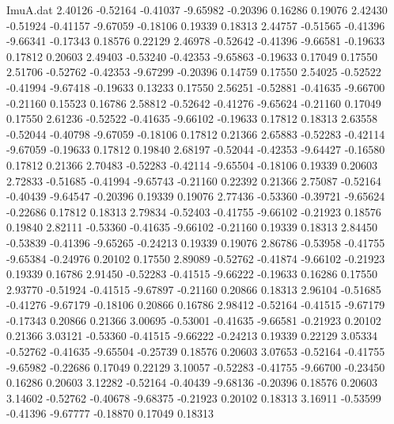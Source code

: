 \begin{filecontents}{ImuA.dat}
   2.40126   -0.52164   -0.41037   -9.65982   -0.20396    0.16286    0.19076
   2.42430   -0.51924   -0.41157   -9.67059   -0.18106    0.19339    0.18313
   2.44757   -0.51565   -0.41396   -9.66341   -0.17343    0.18576    0.22129
   2.46978   -0.52642   -0.41396   -9.66581   -0.19633    0.17812    0.20603
   2.49403   -0.53240   -0.42353   -9.65863   -0.19633    0.17049    0.17550
   2.51706   -0.52762   -0.42353   -9.67299   -0.20396    0.14759    0.17550
   2.54025   -0.52522   -0.41994   -9.67418   -0.19633    0.13233    0.17550
   2.56251   -0.52881   -0.41635   -9.66700   -0.21160    0.15523    0.16786
   2.58812   -0.52642   -0.41276   -9.65624   -0.21160    0.17049    0.17550
   2.61236   -0.52522   -0.41635   -9.66102   -0.19633    0.17812    0.18313
   2.63558   -0.52044   -0.40798   -9.67059   -0.18106    0.17812    0.21366
   2.65883   -0.52283   -0.42114   -9.67059   -0.19633    0.17812    0.19840
   2.68197   -0.52044   -0.42353   -9.64427   -0.16580    0.17812    0.21366
   2.70483   -0.52283   -0.42114   -9.65504   -0.18106    0.19339    0.20603
   2.72833   -0.51685   -0.41994   -9.65743   -0.21160    0.22392    0.21366
   2.75087   -0.52164   -0.40439   -9.64547   -0.20396    0.19339    0.19076
   2.77436   -0.53360   -0.39721   -9.65624   -0.22686    0.17812    0.18313
   2.79834   -0.52403   -0.41755   -9.66102   -0.21923    0.18576    0.19840
   2.82111   -0.53360   -0.41635   -9.66102   -0.21160    0.19339    0.18313
   2.84450   -0.53839   -0.41396   -9.65265   -0.24213    0.19339    0.19076
   2.86786   -0.53958   -0.41755   -9.65384   -0.24976    0.20102    0.17550
   2.89089   -0.52762   -0.41874   -9.66102   -0.21923    0.19339    0.16786
   2.91450   -0.52283   -0.41515   -9.66222   -0.19633    0.16286    0.17550
   2.93770   -0.51924   -0.41515   -9.67897   -0.21160    0.20866    0.18313
   2.96104   -0.51685   -0.41276   -9.67179   -0.18106    0.20866    0.16786
   2.98412   -0.52164   -0.41515   -9.67179   -0.17343    0.20866    0.21366
   3.00695   -0.53001   -0.41635   -9.66581   -0.21923    0.20102    0.21366
   3.03121   -0.53360   -0.41515   -9.66222   -0.24213    0.19339    0.22129
   3.05334   -0.52762   -0.41635   -9.65504   -0.25739    0.18576    0.20603
   3.07653   -0.52164   -0.41755   -9.65982   -0.22686    0.17049    0.22129
   3.10057   -0.52283   -0.41755   -9.66700   -0.23450    0.16286    0.20603
   3.12282   -0.52164   -0.40439   -9.68136   -0.20396    0.18576    0.20603
   3.14602   -0.52762   -0.40678   -9.68375   -0.21923    0.20102    0.18313
   3.16911   -0.53599   -0.41396   -9.67777   -0.18870    0.17049    0.18313

\end{filecontents}
